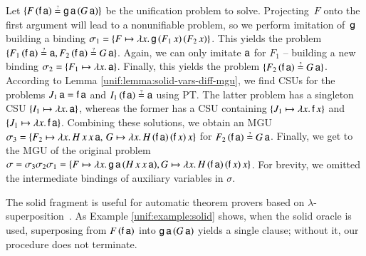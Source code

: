  \begin{exa}
   \label{unif:example:solid}
  Let $\{F \, (\cst{f} \, \cst{a}) \unif \cst{g} \, \cst{a} \, (G \, \cst{a})\}$ be
  the unification problem to solve. Projecting~$F$ onto the first argument will
  lead to a nonunifiable problem, so we perform imitation of~$\mathsf{g}$ building a
  binding $\sigma_1 = \{ F \mapsto \lambda x.\, \mathsf{g} \, (F_1 \, x) \, (F_2 \, x)
  \}$. This yields the  problem $\{F_1
  \, (\cst{f} \, \cst{a}) \unif \cst{a}, \allowbreak F_2 \, (\cst{f} \, \cst{a}) \unif G \,
  \cst{a}\}$. Again, we can only imitate $\mathsf{a}$ for $F_1$ -- building a new 
  binding $\sigma_2 = \{F_1 \mapsto \lambda x.\, \mathsf{a} \}$. Finally, this
  yields the problem $\{ F_2 \, (\cst{f} \, \cst{a}) \unif G \, \cst{a} \}$.
  According to Lemma \ref{unif:lemma:solid-vars-diff-mgu}, we find CSUs for the
  problems $J_1 \, \mathsf{a} = \mathsf{f} \, \mathsf{a}$ and $I_1 \, (\cst{f} \, \cst{a})
  \unif \cst{a}$ using PT. The latter problem has a singleton CSU $\{I_1 \mapsto \lambda x.\,
  \mathsf{a}\}$, whereas the former has a CSU containing $\{ J_1 \mapsto \lambda x.\,
  \mathsf{f} \, x \}$ and $\{ J_1 \mapsto \lambda x.\, \mathsf{f} \, \mathsf{a} \}$.
  Combining these solutions, we obtain an MGU $\sigma_3 =
  \{ F_2 \mapsto \lambda x.\, H \, x \, x \, \mathsf{a},\,
  G   \mapsto \lambda x.\, H \, (\mathsf{f} \, \mathsf{a}) \, (\mathsf{f} \, x) \, x \}$ 
  for $F_2 \, (\cst{f}\, \cst{a}) \unif G \, \cst{a}$.
  Finally, we get to the MGU of the original problem $\sigma = \sigma_3 \sigma_2 \sigma_1 = \{ F
  \mapsto \lambda x.\, \mathsf{g} \, \mathsf{a} \, (H \, x \, x \, \mathsf{a}),\allowbreak G \mapsto
  \lambda x.\, H \, (\mathsf{f} \, \mathsf{a}) \, (\mathsf{f} \, x) \, x  \}$.
  For brevity, we omitted the intermediate bindings of auxiliary variables
  in $\sigma$.
\end{exa}

The solid fragment is useful for automatic theorem provers based on
$\lambda$-su\-per\-po\-si\-tion~\cite{bbtvw-21-sup-lam}. As Example \ref{unif:example:solid} shows, when the solid oracle
is used, superposing from $F \, (\mathsf{f} \, \mathsf{a})$ into $\mathsf{g} \, \mathsf{a}
\, (G \, \mathsf{a})$ yields a single clause; without it, our procedure does not
terminate.


